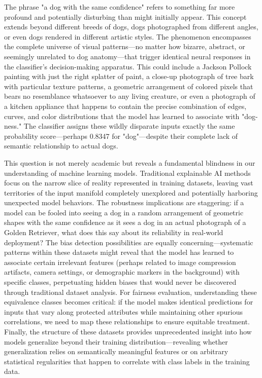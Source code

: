 The phrase "a dog with the same confidence" refers to something far more profound and potentially disturbing than might initially appear. This concept extends beyond different breeds of dogs, dogs photographed from different angles, or even dogs rendered in different artistic styles. The phenomenon encompasses the complete universe of visual patterns—no matter how bizarre, abstract, or seemingly unrelated to dog anatomy—that trigger identical neural responses in the classifier's decision-making apparatus. This could include a Jackson Pollock painting with just the right splatter of paint, a close-up photograph of tree bark with particular texture patterns, a geometric arrangement of colored pixels that bears no resemblance whatsoever to any living creature, or even a photograph of a kitchen appliance that happens to contain the precise combination of edges, curves, and color distributions that the model has learned to associate with "dog-ness." The classifier assigns these wildly disparate inputs exactly the same probability score—perhaps 0.8347 for "dog"—despite their complete lack of semantic relationship to actual dogs.

This question is not merely academic but reveals a fundamental blindness in our understanding of machine learning models. Traditional explainable AI methods focus on the narrow slice of reality represented in training datasets, leaving vast territories of the input manifold completely unexplored and potentially harboring unexpected model behaviors. The robustness implications are staggering: if a model can be fooled into seeing a dog in a random arrangement of geometric shapes with the same confidence as it sees a dog in an actual photograph of a Golden Retriever, what does this say about its reliability in real-world deployment? The bias detection possibilities are equally concerning—systematic patterns within these datasets might reveal that the model has learned to associate certain irrelevant features (perhaps related to image compression artifacts, camera settings, or demographic markers in the background) with specific classes, perpetuating hidden biases that would never be discovered through traditional dataset analysis. For fairness evaluation, understanding these equivalence classes becomes critical: if the model makes identical predictions for inputs that vary along protected attributes while maintaining other spurious correlations, we need to map these relationships to ensure equitable treatment. Finally, the structure of these datasets provides unprecedented insight into how models generalize beyond their training distribution—revealing whether generalization relies on semantically meaningful features or on arbitrary statistical regularities that happen to correlate with class labels in the training data.

